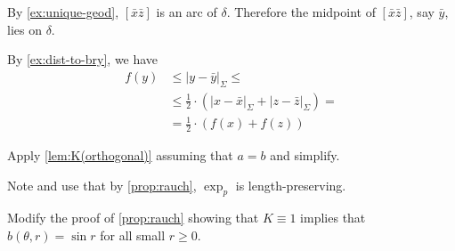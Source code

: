 By \ref{ex:unique-geod}, $[\bar x\bar z]$ is an arc of $\delta$.
Therefore the midpoint of $[\bar x\bar z]$, say  $\bar y$, lies on $\delta$.

By \ref{ex:dist-to-bry}, we have 
\begin{align*}
f(y)&\le |y-\bar y|_\Sigma\le
\\
&\le\tfrac12\cdot(|x-\bar x|_\Sigma
+
|z-\bar z|_\Sigma)=
\\
&=\tfrac12\cdot(f(x)+f(z))
\end{align*}

 Apply \ref{lem:K(orthogonal)} assuming that $a=b$ and simplify.

 Note and use that by \ref{prop:rauch}, $\exp_p$ is length-preserving.

{

 Modify the proof of \ref{prop:rauch} showing that $K\equiv 1$ implies that $b(\theta,r)=\sin r$ for all small $r\ge 0$.

}

